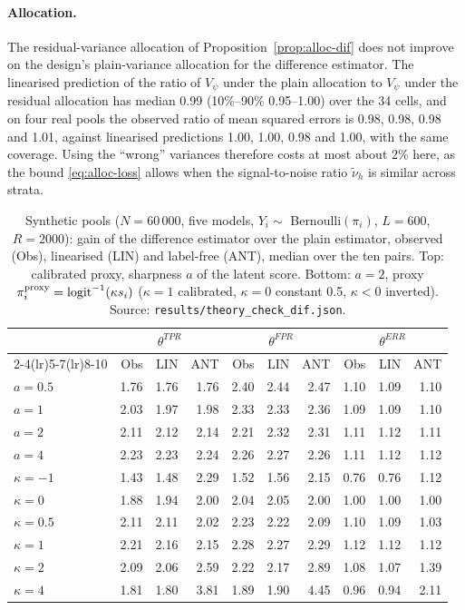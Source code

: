 \documentclass[pdflatex,sn-mathphys-num,iicol]{sn-jnl}
\theoremstyle{thmstyleone}
\theoremstyle{thmstyletwo}
\theoremstyle{thmstylethree}
\begin{document}
\paragraph{Allocation.} The residual-variance allocation of Proposition~\ref{prop:alloc-dif} does not improve on the design's plain-variance allocation for the difference estimator. The linearised prediction of the ratio of $V_\psi$ under the plain allocation to $V_\psi$ under the residual allocation has median 0.99
(10\%--90\% 0.95--1.00) over the 34 cells, and on four real pools the observed ratio of mean squared errors is 0.98, 0.98, 0.98 and 1.01, against linearised predictions 1.00, 1.00, 0.98 and 1.00, with the same coverage. Using the ``wrong'' variances therefore costs at most about 2\% here, as the bound \eqref{eq:alloc-loss} allows when the signal-to-noise ratio $\tilde\nu_h$ is similar across strata.

\begin{table}[t]
\centering
\caption{Synthetic pools ($N=60\,000$, five models, $Y_i\sim$ Bernoulli$(\pi_i)$, $L=600$, $R=2000$): gain of the difference estimator over the plain estimator, observed (Obs), linearised (LIN) and label-free (ANT), median over the ten pairs. Top: calibrated proxy,
sharpness $a$ of the latent score. Bottom: $a=2$, proxy $\pi^{\rm proxy}_i=\mathrm{logit}^{-1}(\kappa s_i)$ ($\kappa=1$ calibrated, $\kappa=0$ constant 0.5, $\kappa<0$ inverted). Source: \texttt{results/theory\_check\_dif.json}.}
\label{tab:sim-dif-syn}
\setlength{\tabcolsep}{4pt}
\small
\begin{tabular}{l rrr rrr rrr}
\toprule
 & \multicolumn{3}{c}{$\theta^{TPR}$} & \multicolumn{3}{c}{$\theta^{FPR}$} & \multicolumn{3}{c}{$\theta^{ERR}$}\\
 \cmidrule(lr){2-4}\cmidrule(lr){5-7}\cmidrule(lr){8-10}
 & Obs & LIN & ANT & Obs & LIN & ANT & Obs & LIN & ANT\\
\midrule
$a=0.5$ & 1.76 & 1.76 & 1.76 & 2.40 & 2.44 & 2.47 & 1.10 & 1.09 & 1.10 \\
$a=1$ & 2.03 & 1.97 & 1.98 & 2.33 & 2.33 & 2.36 & 1.09 & 1.09 & 1.10 \\
$a=2$ & 2.11 & 2.12 & 2.14 & 2.21 & 2.32 & 2.31 & 1.11 & 1.12 & 1.11 \\
$a=4$ & 2.23 & 2.23 & 2.24 & 2.26 & 2.27 & 2.26 & 1.11 & 1.12 & 1.12 \\
\midrule
$\kappa=-1$ & 1.43 & 1.48 & 2.29 & 1.52 & 1.56 & 2.15 & 0.76 & 0.76 & 1.12 \\
$\kappa=0$ & 1.88 & 1.94 & 2.00 & 2.04 & 2.05 & 2.00 & 1.00 & 1.00 & 1.00 \\
$\kappa=0.5$ & 2.11 & 2.11 & 2.02 & 2.23 & 2.22 & 2.09 & 1.10 & 1.09 & 1.03 \\
$\kappa=1$ & 2.21 & 2.16 & 2.15 & 2.28 & 2.27 & 2.29 & 1.12 & 1.12 & 1.12 \\
$\kappa=2$ & 2.09 & 2.06 & 2.59 & 2.22 & 2.17 & 2.89 & 1.08 & 1.07 & 1.39 \\
$\kappa=4$ & 1.81 & 1.80 & 3.81 & 1.89 & 1.90 & 4.45 & 0.96 & 0.94 & 2.11 \\
\bottomrule
\end{tabular}
\end{table}
\end{document}
